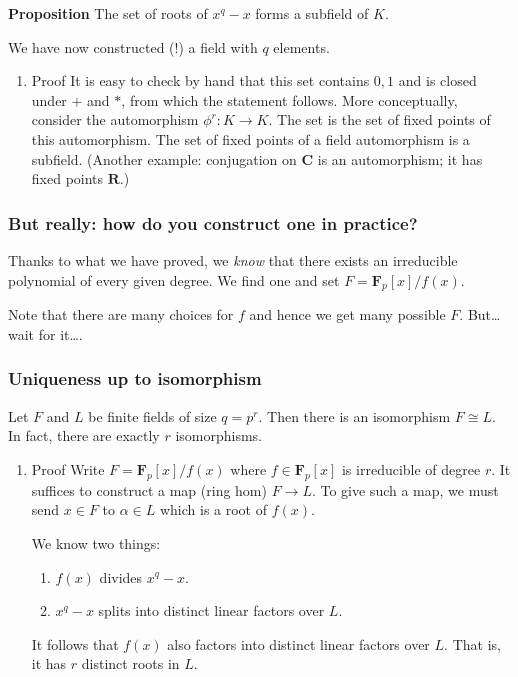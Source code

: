 \documentclass[11pt]{article}
\begin{document}
\textbf{\textbf{Proposition}} The set of roots of \(x^q-x\) forms a subfield of \(K\).

We have now constructed (!) a field with \(q\) elements.
\begin{enumerate}
\item Proof
\label{sec:orga6c4117}
It is easy to check by hand that this set contains \(0,1\) and is closed under \(+\) and \(*\), from which the statement follows.
More conceptually, consider the automorphism \(\phi^r \colon K \to K\).  The set is the set of fixed points of this automorphism.
The set of fixed points of a field automorphism is a subfield.
(Another example: conjugation on \(\mathbf{C}\) is an automorphism; it has fixed points \(\mathbf{R}\).)
\end{enumerate}
\subsubsection{But really: how do you construct one in practice?}
\label{sec:org68d6899}
Thanks to what we have proved, we \emph{know} that there exists an irreducible polynomial of every given degree.
We find one and set \(F = \mathbf{F}_p[x]/f(x)\).

Note that there are many choices for \(f\) and hence we get many possible \(F\).
But\ldots{} wait for it\ldots{}.
\subsubsection{Uniqueness up to isomorphism}
\label{sec:orgd8e521d}
Let \(F\) and \(L\) be finite fields of size \(q = p^r\).
Then there is an isomorphism \(F \cong L\).
In fact, there are exactly \(r\) isomorphisms.
\begin{enumerate}
\item Proof
\label{sec:orgc332f61}
Write \(F = \mathbf{F}_p[x]/f(x)\) where \(f \in \mathbf{F}_p[x]\) is irreducible of degree \(r\).
It suffices to construct a map (ring hom) \(F \to L\).
To give such a map, we must send \(x \in F\) to \(\alpha \in L\) which is a root of \(f(x)\).

We know two things:
\begin{enumerate}
\item \(f(x)\) divides \(x^q-x\).
\item \(x^q-x\) splits into distinct linear factors over \(L\).
\end{enumerate}
It follows that \(f(x)\) also factors into distinct linear factors over \(L\).
That is, it has \(r\) distinct roots in \(L\).
\end{enumerate}
\end{document}
